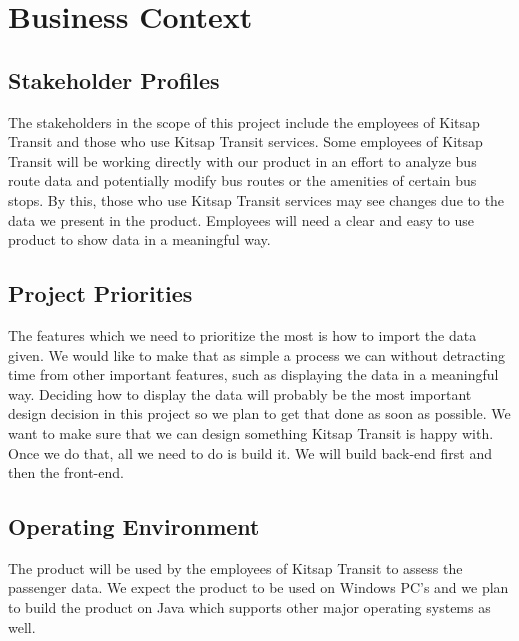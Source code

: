 \section{Business Context}

\subsection{Stakeholder Profiles}
The stakeholders in the scope of this project include the employees of Kitsap Transit
and those who use Kitsap Transit services. Some employees of Kitsap Transit will be
working directly with our product in an effort to analyze bus route data and potentially
modify bus routes or the amenities of certain bus stops. By this, those who use Kitsap
Transit services may see changes due to the data we present in the product. Employees will
need a clear and easy to use product to show data in a meaningful way.

\subsection{Project Priorities}
The features which we need to prioritize the most is how to import the data given. We would
like to make that as simple a process we can without detracting time from other important
features, such as displaying the data in a meaningful way. Deciding how to display the data
will probably be the most important design decision in this project so we plan to get that
done as soon as possible. We want to make sure that we can design something Kitsap Transit
is happy with. Once we do that, all we need to do is build it. We will build back-end first
and then the front-end.

\subsection{Operating Environment}
The product will be used by the employees of Kitsap Transit to assess the passenger data.
We expect the product to be used on Windows PC's and we plan to build the product on Java
which supports other major operating systems as well.

